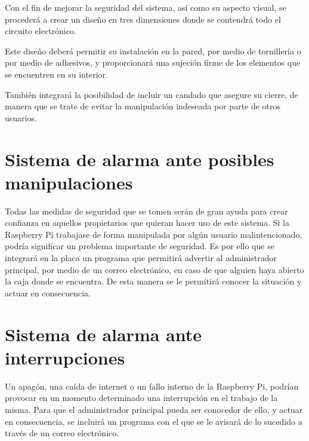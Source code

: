 \noindent Con el fin de mejorar la seguridad del sistema, así como su aspecto visual, se procederá a crear un diseño en tres dimensiones donde se contendrá todo el circuito electrónico.

Este diseño deberá permitir su instalación en la pared, por medio de tornillería o por medio de adhesivos, y proporcionará una sujeción firme de los elementos que se encuentren en su interior.

También integrará la posibilidad de incluir un candado que asegure su cierre, de manera que se trate de evitar la manipulación indeseada por parte de otros usuarios.


\section{Sistema de alarma ante posibles manipulaciones} 
\label{sec:sistema-de-alarma-ante-posibles-manipulaciones}

\noindent Todas las medidas de seguridad que se tomen serán de gran ayuda para crear confianza en aquellos propietarios que quieran hacer uso de este sistema. Si la Raspberry Pi trabajase de forma manipulada por algún usuario malintencionado, podría significar un problema importante de seguridad. Es por ello que se integrará en la placa un programa que permitirá advertir al administrador principal, por medio de un correo electrónico, en caso de que alguien haya abierto la caja donde se encuentra. De esta manera se le permitirá conocer la situación y actuar en consecuencia.

\section{Sistema de alarma ante interrupciones} 
\label{sec:sistema-de-alarma-ante-interrupciones}

\noindent Un apagón, una caída de internet o un fallo interno de la Raspberry Pi, podrían provocar en un momento determinado una interrupción en el trabajo de la misma. Para que el administrador principal pueda ser conocedor de ello, y actuar en consecuencia, se incluirá un programa con el que se le avisará de lo sucedido a través de un correo electrónico.
